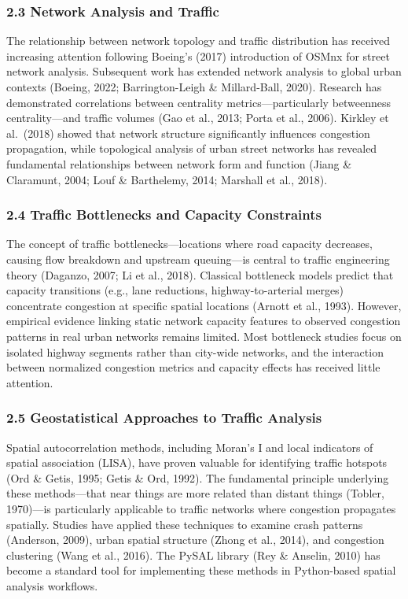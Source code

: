 \subsubsection{2.3 Network Analysis and Traffic}\label{network-analysis-and-traffic}

The relationship between network topology and traffic distribution has received increasing attention following Boeing's (2017) introduction of OSMnx for street network analysis. Subsequent work has extended network analysis to global urban contexts (Boeing, 2022; Barrington-Leigh \& Millard-Ball, 2020). Research has demonstrated correlations between centrality metrics---particularly betweenness centrality---and traffic volumes (Gao et al., 2013; Porta et al., 2006). Kirkley et al.~(2018) showed that network structure significantly influences congestion propagation, while topological analysis of urban street networks has revealed fundamental relationships between network form and function (Jiang \& Claramunt, 2004; Louf \& Barthelemy, 2014; Marshall et al., 2018).

\subsubsection{2.4 Traffic Bottlenecks and Capacity Constraints}\label{traffic-bottlenecks-and-capacity-constraints}

The concept of traffic bottlenecks---locations where road capacity decreases, causing flow breakdown and upstream queuing---is central to traffic engineering theory (Daganzo, 2007; Li et al., 2018). Classical bottleneck models predict that capacity transitions (e.g., lane reductions, highway-to-arterial merges) concentrate congestion at specific spatial locations (Arnott et al., 1993). However, empirical evidence linking static network capacity features to observed congestion patterns in real urban networks remains limited. Most bottleneck studies focus on isolated highway segments rather than city-wide networks, and the interaction between normalized congestion metrics and capacity effects has received little attention.

\subsubsection{2.5 Geostatistical Approaches to Traffic Analysis}\label{geostatistical-approaches-to-traffic-analysis}

Spatial autocorrelation methods, including Moran's I and local indicators of spatial association (LISA), have proven valuable for identifying traffic hotspots (Ord \& Getis, 1995; Getis \& Ord, 1992). The fundamental principle underlying these methods---that near things are more related than distant things (Tobler, 1970)---is particularly applicable to traffic networks where congestion propagates spatially. Studies have applied these techniques to examine crash patterns (Anderson, 2009), urban spatial structure (Zhong et al., 2014), and congestion clustering (Wang et al., 2016). The PySAL library (Rey \& Anselin, 2010) has become a standard tool for implementing these methods in Python-based spatial analysis workflows.

